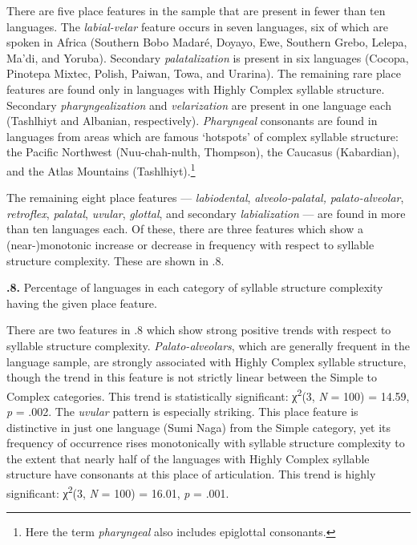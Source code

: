   There are five place features in the sample that are present in fewer than ten languages. The \textit{labial-velar} feature occurs in seven languages, six of which are spoken in Africa (Southern Bobo Madaré, Doyayo, Ewe, Southern Grebo, Lelepa, Ma’di, and Yoruba). Secondary \textit{palatalization} is present in six languages (Cocopa, Pinotepa Mixtec, Polish, Paiwan, Towa, and Urarina). The remaining rare place features are found only in languages with Highly Complex syllable structure. Secondary \textit{pharyngealization} and \textit{velarization} are present in one language each (Tashlhiyt and Albanian, respectively). \textit{Pharyngeal} consonants are found in languages from areas which are famous ‘hotspots’ of complex syllable structure: the Pacific Northwest (Nuu-chah-nulth, Thompson), the Caucasus (Kabardian), and the Atlas Mountains (Tashlhiyt).\footnote{ \textrm{Here the term} \textrm{\textit{pharyngeal} }\textrm{also includes epiglottal consonants.}}

  The remaining eight place features — \textit{labiodental}, \textit{alveolo-palatal,} \textit{palato-alveolar}, \textit{retroflex}, \textit{palatal}, \textit{uvular}, \textit{glottal}, and secondary \textit{labialization} — are found in more than ten languages each. Of these, there are three features which show a (near-)monotonic increase or decrease in frequency with respect to syllable structure complexity. These are shown in .8.

\textbf{.8.} Percentage of languages in each category of syllable structure complexity having the given place feature.

  There are two features in .8 which show strong positive trends with respect to syllable structure complexity. \textit{Palato-alveolars}, which are generally frequent in the language sample, are strongly associated with Highly Complex syllable structure, though the trend in this feature is not strictly linear between the Simple to Complex categories. This trend is statistically significant: χ\textsuperscript{2}(3, \textit{N} = 100) = 14.59, \textit{p} = .002. The \textit{uvular} pattern is especially striking. This place feature is distinctive in just one language (Sumi Naga) from the Simple category, yet its frequency of occurrence rises monotonically with syllable structure complexity to the extent that nearly half of the languages with Highly Complex syllable structure have consonants at this place of articulation. This trend is highly significant: χ\textsuperscript{2}(3, \textit{N} = 100) = 16.01, \textit{p} = .001. 


